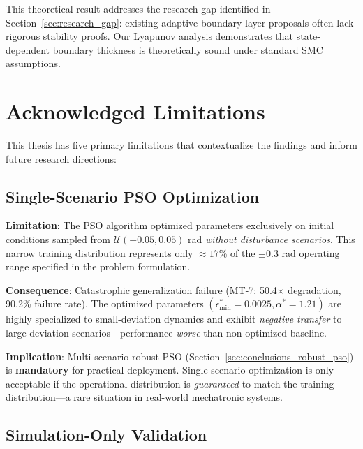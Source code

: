This theoretical result addresses the research gap identified in Section~\ref{sec:research_gap}: existing adaptive boundary layer proposals often lack rigorous stability proofs. Our Lyapunov analysis demonstrates that state-dependent boundary thickness is theoretically sound under standard SMC assumptions.

\section{Acknowledged Limitations}
\label{sec:conclusions_limitations}

This thesis has five primary limitations that contextualize the findings and inform future research directions:

\subsection{Single-Scenario PSO Optimization}
\label{subsec:limitation_single_scenario}

\textbf{Limitation}: The PSO algorithm optimized parameters exclusively on initial conditions sampled from $\mathcal{U}(-0.05, 0.05)$ rad \textit{without disturbance scenarios}. This narrow training distribution represents only $\approx 17$\% of the $\pm0.3$ rad operating range specified in the problem formulation.

\textbf{Consequence}: Catastrophic generalization failure (MT-7: 50.4$\times$ degradation, 90.2\% failure rate). The optimized parameters $(\epsilon_{\min}^* = 0.0025, \alpha^* = 1.21)$ are highly specialized to small-deviation dynamics and exhibit \textit{negative transfer} to large-deviation scenarios—performance \textit{worse} than non-optimized baseline.

\textbf{Implication}: Multi-scenario robust PSO (Section~\ref{sec:conclusions_robust_pso}) is \textbf{mandatory} for practical deployment. Single-scenario optimization is only acceptable if the operational distribution is \textit{guaranteed} to match the training distribution—a rare situation in real-world mechatronic systems.

\subsection{Simulation-Only Validation}
\label{subsec:limitation_simulation}

